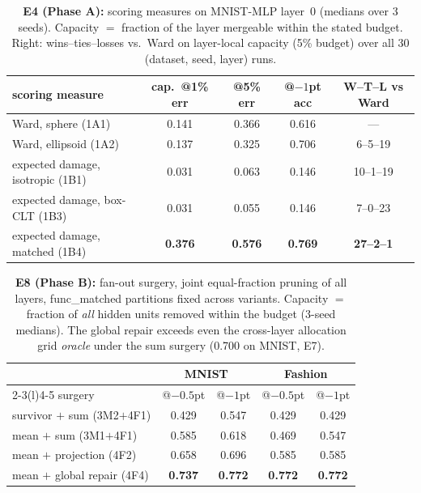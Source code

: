 \documentclass[11pt]{article}
\theoremstyle{remark}
\begin{document}
\begin{table}[t]
\centering\small
\caption{\textbf{E4 (Phase A):} scoring measures on MNIST-MLP layer~0
(medians over 3 seeds). Capacity $=$ fraction of the layer mergeable within
the stated budget. Right: wins--ties--losses vs.\ Ward on layer-local
capacity (5\% budget) over all 30 (dataset, seed, layer) runs.}
\label{tab:phaseA}
\begin{tabular}{@{}lccc c@{}}
\toprule
scoring measure & cap.\ @1\% err & @5\% err & @$-1$pt acc & W--T--L vs Ward \\
\midrule
Ward, sphere (1A1)            & 0.141 & 0.366 & 0.616 & --- \\
Ward, ellipsoid (1A2)         & 0.137 & 0.325 & 0.706 & 6--5--19 \\
expected damage, isotropic (1B1) & 0.031 & 0.063 & 0.146 & 10--1--19 \\
expected damage, box-CLT (1B3)   & 0.031 & 0.055 & 0.146 & 7--0--23 \\
expected damage, matched (1B4)   & \textbf{0.376} & \textbf{0.576} & \textbf{0.769} & \textbf{27--2--1} \\
\bottomrule
\end{tabular}
\end{table}

\begin{table}[t]
\centering\small
\caption{\textbf{E8 (Phase B):} fan-out surgery, joint equal-fraction
pruning of all layers, func\_matched partitions fixed across variants.
Capacity $=$ fraction of \emph{all} hidden units removed within the budget
(3-seed medians). The global repair exceeds even the cross-layer allocation
grid \emph{oracle} under the sum surgery (0.700 on MNIST, E7).}
\label{tab:phaseB}
\begin{tabular}{@{}lcc cc@{}}
\toprule
& \multicolumn{2}{c}{MNIST} & \multicolumn{2}{c}{Fashion} \\
\cmidrule(lr){2-3}\cmidrule(l){4-5}
surgery & @$-0.5$pt & @$-1$pt & @$-0.5$pt & @$-1$pt \\
\midrule
survivor $+$ sum (3M2$+$4F1) & 0.429 & 0.547 & 0.429 & 0.429 \\
mean $+$ sum (3M1$+$4F1)     & 0.585 & 0.618 & 0.469 & 0.547 \\
mean $+$ projection (4F2)    & 0.658 & 0.696 & 0.585 & 0.585 \\
mean $+$ global repair (4F4) & \textbf{0.737} & \textbf{0.772} & \textbf{0.772} & \textbf{0.772} \\
\bottomrule
\end{tabular}
\end{table}
\end{document}
